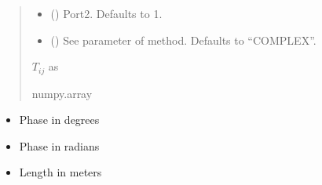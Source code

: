 \documentclass[letterpaper,10pt,english]{sphinxmanual}
\begin{document}
\begin{fulllineitems}
\begin{fulllineitems}
\begin{quote}
\begin{description}
\begin{itemize}
\item {} 
\sphinxAtStartPar
{} (\sphinxstyleliteralemphasis{\sphinxupquote{, }}) \textendash{} Port\sphinxhyphen{}2. Defaults to 1.

\item {} 
\sphinxAtStartPar
{} (\sphinxstyleliteralemphasis{\sphinxupquote{, }}) \textendash{} See  parameter of  method. Defaults to “COMPLEX”.

\end{itemize}

\sphinxAtStartPar
\(T_{i j}\) as 

\sphinxAtStartPar
numpy.array

\end{description}\end{quote}

\end{fulllineitems}


\begin{fulllineitems}
\label{\detokenize{touchstone:touchstone.spfile.UniformDeembed}}
\pysigstartsignatures
{}
\pysigstopsignatures\begin{description}
\begin{itemize}
\item {} 
\sphinxAtStartPar
Phase in degrees

\item {} 
\sphinxAtStartPar
Phase in radians

\item {} 
\sphinxAtStartPar
Length in meters


\end{itemize}
\end{description}
\end{fulllineitems}
\end{fulllineitems}
\end{document}

